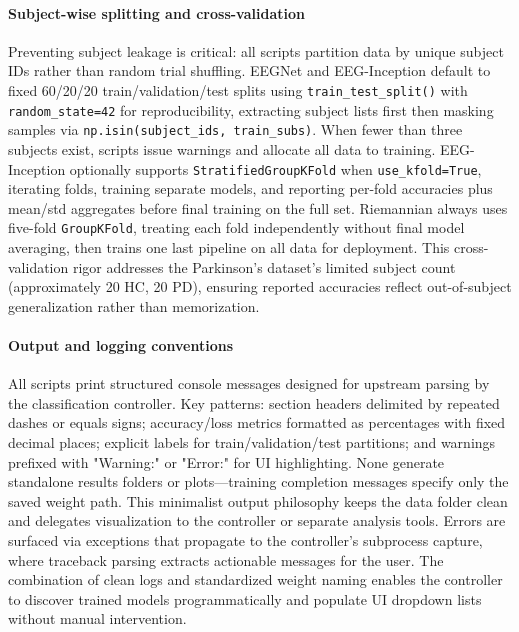 \documentclass[12pt]{report}
\begin{document}
\paragraph{Subject-wise splitting and cross-validation}\mbox{}

Preventing subject leakage is critical: all scripts partition data by unique subject IDs rather than random trial shuffling. EEGNet and EEG-Inception default to fixed 60/20/20 train/validation/test splits using \texttt{train\_test\_split()} with \texttt{random\_state=42} for reproducibility, extracting subject lists first then masking samples via \texttt{np.isin(subject\_ids, train\_subs)}. When fewer than three subjects exist, scripts issue warnings and allocate all data to training. EEG-Inception optionally supports \texttt{StratifiedGroupKFold} when \texttt{use\_kfold=True}, iterating folds, training separate models, and reporting per-fold accuracies plus mean/std aggregates before final training on the full set. Riemannian always uses five-fold \texttt{GroupKFold}, treating each fold independently without final model averaging, then trains one last pipeline on all data for deployment. This cross-validation rigor addresses the Parkinson's dataset's limited subject count (approximately 20 HC, 20 PD), ensuring reported accuracies reflect out-of-subject generalization rather than memorization.

\paragraph{Output and logging conventions}\mbox{}

All scripts print structured console messages designed for upstream parsing by the classification controller. Key patterns: section headers delimited by repeated dashes or equals signs; accuracy/loss metrics formatted as percentages with fixed decimal places; explicit labels for train/validation/test partitions; and warnings prefixed with "Warning:" or "Error:" for UI highlighting. None generate standalone results folders or plots—training completion messages specify only the saved weight path. This minimalist output philosophy keeps the data folder clean and delegates visualization to the controller or separate analysis tools. Errors are surfaced via exceptions that propagate to the controller's subprocess capture, where traceback parsing extracts actionable messages for the user. The combination of clean logs and standardized weight naming enables the controller to discover trained models programmatically and populate UI dropdown lists without manual intervention.
\end{document}
